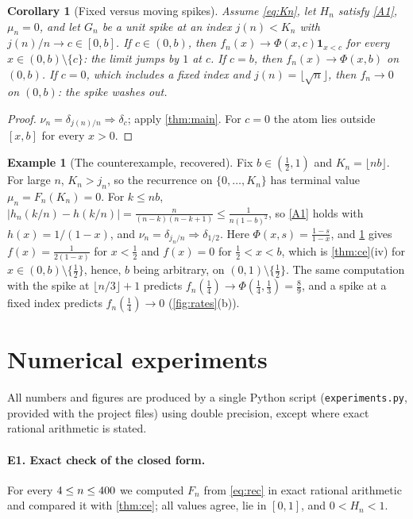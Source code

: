 \documentclass[11pt]{article}
\newtheorem{corollary}[theorem]{Corollary}
\theoremstyle{definition}
\newtheorem{example}[theorem]{Example}
\theoremstyle{remark}
\newcommand{\1}{\mathbf{1}}
\newcommand{\fl}[1]{\lfloor #1\rfloor}
\newcommand{\weak}{\Rightarrow}
\begin{document}
\begin{corollary}[Fixed versus moving spikes]\label{cor:spikes}
Assume \eqref{eq:Kn}, let $H_n$ satisfy \ref{A1}, $\mu_n=0$, and let $G_n$ be a unit spike at an
index $j(n)<K_n$ with $j(n)/n\to c\in[0,b]$. If $c\in(0,b)$, then $f_n(x)\to\Phi(x,c)\1_{x<c}$ for
every $x\in(0,b)\setminus\{c\}$: the limit jumps by $1$ at $c$. If $c=b$, then
$f_n(x)\to\Phi(x,b)$ on $(0,b)$. If $c=0$, which includes a fixed index and $j(n)=\fl{\sqrt n}$,
then $f_n\to0$ on $(0,b)$: the spike washes out.
\end{corollary}

\begin{proof}
$\nu_n=\delta_{j(n)/n}\weak\delta_c$; apply \cref{thm:main}. For $c=0$ the atom lies outside
$[x,b]$ for every $x>0$.
\end{proof}

\begin{example}[The counterexample, recovered]\label{ex:recover}
Fix $b\in(\frac12,1)$ and $K_n=\fl{nb}$. For large $n$, $K_n>j_n$, so the recurrence on
$\{0,\dots,K_n\}$ has terminal value $\mu_n=F_n(K_n)=0$. For $k\le nb$,
$|h_n(k/n)-h(k/n)|=\frac{n}{(n-k)(n-k+1)}\le\frac{1}{n(1-b)^2}$, so \ref{A1} holds with
$h(x)=1/(1-x)$, and $\nu_n=\delta_{j_n/n}\weak\delta_{1/2}$. Here
$\Phi(x,s)=\frac{1-s}{1-x}$, and \cref{cor:spikes} gives $f(x)=\frac{1}{2(1-x)}$ for $x<\frac12$
and $f(x)=0$ for $\frac12<x<b$, which is \cref{thm:ce}(iv) for $x\in(0,b)\setminus\{\frac12\}$,
hence, $b$ being arbitrary, on $(0,1)\setminus\{\frac12\}$. The same computation with the spike at
$\fl{n/3}+1$ predicts $f_n(\frac14)\to\Phi(\frac14,\frac13)=\frac89$, and a spike at a fixed index
predicts $f_n(\frac14)\to0$ (\cref{fig:rates}(b)).
\end{example}

\section{Numerical experiments}\label{sec:numerics}

All numbers and figures are produced by a single Python script (\texttt{experiments.py}, provided
with the project files) using double precision, except where exact rational arithmetic is stated.

\paragraph{E1. Exact check of the closed form.} For every $4\le n\le400$ we computed
$F_n$ from \eqref{eq:rec} in exact rational arithmetic and compared it with
\cref{thm:ce}; all values agree, lie in $[0,1]$, and $0<H_n<1$.
\end{document}
